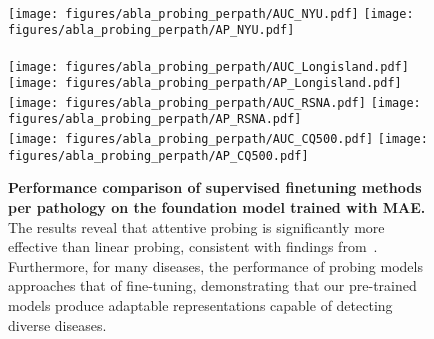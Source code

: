 \begin{figure}
    \centering
     \\[0.2cm]
    \texttt{[image: figures/abla\_probing\_perpath/AUC\_NYU.pdf]}
    \texttt{[image: figures/abla\_probing\_perpath/AP\_NYU.pdf]}\\
     \\[0.2cm]
    \texttt{[image: figures/abla\_probing\_perpath/AUC\_Longisland.pdf]}
    \texttt{[image: figures/abla\_probing\_perpath/AP\_Longisland.pdf]} 
     \\[0.2cm]
    \texttt{[image: figures/abla\_probing\_perpath/AUC\_RSNA.pdf]}
    \texttt{[image: figures/abla\_probing\_perpath/AP\_RSNA.pdf]} 
     \\[0.2cm]
    \texttt{[image: figures/abla\_probing\_perpath/AUC\_CQ500.pdf]}
    \texttt{[image: figures/abla\_probing\_perpath/AP\_CQ500.pdf]} 
    \caption{\textbf{Performance comparison of supervised finetuning methods per pathology on the foundation model trained with MAE.} The results reveal that attentive probing is significantly more effective than linear probing, consistent with findings from~\cite{Chen2024}. Furthermore, for many diseases, the performance of probing models approaches that of fine-tuning, demonstrating that our pre-trained models produce adaptable representations capable of detecting diverse diseases.}
    \label{fig:probing-comparison-perpath}
\end{figure}

